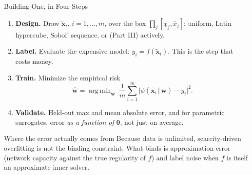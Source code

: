 \documentclass[aspectratio=169,11pt]{beamer}
\newcommand{\emphc}[1]{\textcolor{harvardcrimson}{#1}}
\newcommand{\x}{\bm{x}}
\newcommand{\str}{\bm{\theta}}          %
\newcommand{\netw}{\bm{w}}              %
\newcommand{\surr}{\phi}                %
\DeclareMathOperator*{\argmin}{arg\,min}
\begin{document}
\begin{frame}{Building One, in Four Steps}
\small
\begin{enumerate}\itemsep2pt
  \item \textbf{Design.} Draw $\tilde{\x}_i$, $i = 1,\dots,m$, over the box $\prod_j [\underline{x}_j, \bar{x}_j]$: uniform, Latin hypercube, Sobol' sequence, or (Part III) actively.
  \item \textbf{Label.} Evaluate the expensive model: $y_i = f(\tilde{\x}_i)$. \emphc{This is the step that costs money.}
  \item \textbf{Train.} Minimize the empirical risk
  \[
  \hat{\netw} = \argmin_{\netw}\; \frac{1}{m}\sum_{i=1}^{m}
  \bigl|\surr(\tilde{\x}_i\,|\,\netw) - y_i\bigr|^2 .
  \]
  \item \textbf{Validate.} Held-out max and mean absolute error, and for parametric surrogates, error \emph{as a function of} $\str$, not just on average.
\end{enumerate}

\vspace{0.15cm}
\begin{block}{Where the error actually comes from}
Because data is unlimited, scarcity-driven overfitting is not the binding constraint. What binds is \emphc{approximation error} (network capacity against the true regularity of $f$) and \emphc{label noise} when $f$ is itself an approximate inner solver.
\end{block}
\end{frame}
\end{document}
